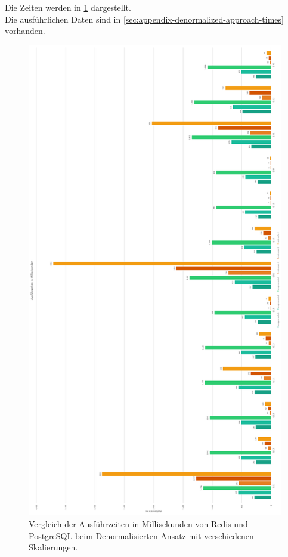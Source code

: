 Die Zeiten werden in \cref{pic:scale} dargestellt.\\
Die ausführlichen Daten sind in \cref{sec:appendix-denormalized-approach-times} vorhanden.
\newpage
\begin{figure}[p]
    \centering
    \includegraphics[height=0.9\textheight]{pictures/results/results-denormalized-scaled.png}
    \caption{Vergleich der Ausführzeiten in Millisekunden von Redis und PostgreSQL beim Denormalisierten-Ansatz mit verschiedenen Skalierungen.}
    \label{pic:scale}
\end{figure}

